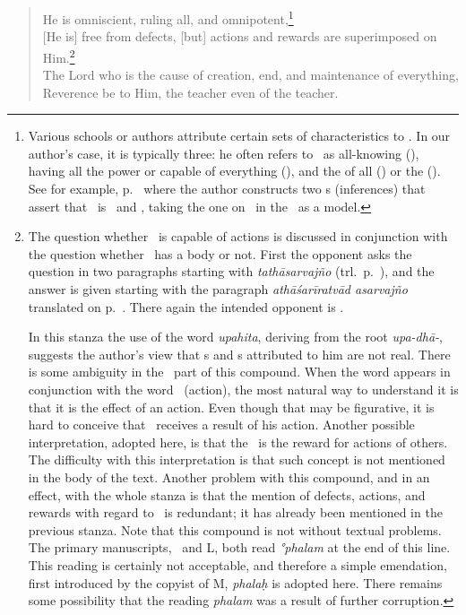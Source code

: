 \begin{verse}
  He%
 is omniscient, ruling all, and omnipotent,\footnote{Various schools or authors attribute certain sets of characteristics to \Isvara. In our author's case, it is typically three: he often refers to \Isvara\ as all-knowing (\sarvajna), having all the power or capable of everything (\sarvasakti), and the  of all (\sarvesvara) or the  (\paramesvara).  See for example, p.~\pageref{TTHSKT25} where the author constructs two \anumana\/s (inferences) that assert that \Isvara\ is \sarvasakti\ and \paramesvara, taking the one on \jnana\ in the \YBh\ as a model.}\\
  {}[He is] free from defects, [but] actions and rewards are superimposed on Him.\footnote{\label{OSTWO}The question whether \Isvara\ is capable of actions is discussed in conjunction with the question whether \Isvara\ has a body or not.  First the opponent asks the question in two paragraphs starting with \emph{tathāsarvajño}  (trl.\ p.~\pageref{TTHASRV25}), and the answer is given starting with the paragraph \emph{athāśarīratvād asarvajño}  translated on p.~\pageref{ATHSRRTVS}. There again the intended opponent is \Kumarila.

In this stanza the use of the word \emph{upahita}, deriving from the root \emph{upa-dhā-}, suggests the author's view that \kriya s and \phala s attributed to him are not real.  There is some ambiguity in the \phala\ part of this compound.  When the word appears in conjunction with the word \kriya\ (action), the most natural way to understand it is that it is the effect of an action.  Even though that may be figurative, it is hard to conceive that \Isvara\ receives a result of his action.  Another possible interpretation, adopted here, is that the \phala\ is the reward for actions of others.  The difficulty with this interpretation is that such concept is not mentioned in the body of the text.  Another problem with this compound, and in an effect, with the whole stanza is that the mention of defects, actions, and rewards with regard to \Isvara\ is redundant; it has already been mentioned in the previous stanza.  Note that this compound is not without textual problems.  The primary manuscripts, \Tm\ and L, both read \emph{°phalam} at the end of this line.  This reading is certainly not acceptable, and therefore a simple emendation, first introduced by the copyist of M, \emph{phalaḥ} is adopted here.  There remains some possibility that the reading \emph{phalam} was a result of further corruption.}%
\\  The Lord who is the cause of creation, end, and maintenance of everything,\\
  Reverence be to Him, the teacher even of the teacher.
\end{verse}\label{OSTZ2E}

